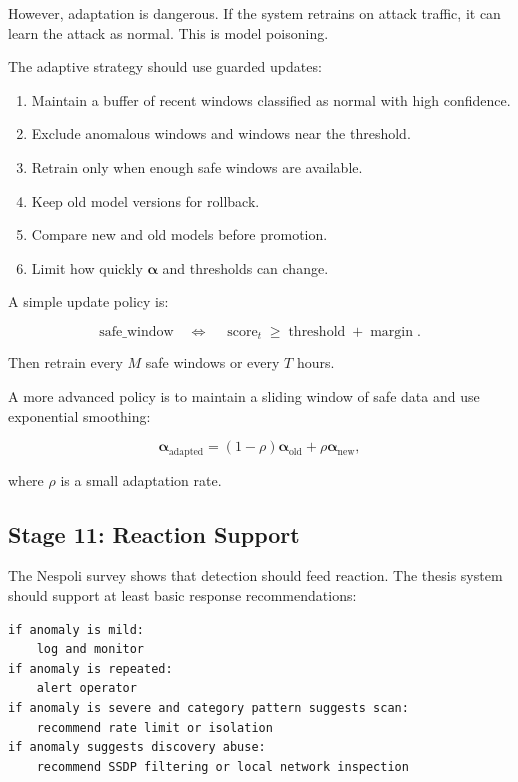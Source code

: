 \documentclass[11pt,a4paper]{article}
\begin{document}
However, adaptation is dangerous. If the system retrains on attack traffic, it can learn the attack as normal. This is model poisoning.

The adaptive strategy should use guarded updates:

\begin{enumerate}
  \item Maintain a buffer of recent windows classified as normal with high confidence.
  \item Exclude anomalous windows and windows near the threshold.
  \item Retrain only when enough safe windows are available.
  \item Keep old model versions for rollback.
  \item Compare new and old models before promotion.
  \item Limit how quickly \(\boldsymbol{\alpha}\) and thresholds can change.
\end{enumerate}

A simple update policy is:

\[
\mathrm{safe\_window}
\quad\Longleftrightarrow\quad
\operatorname{score}_t
\geq
\operatorname{threshold}+\operatorname{margin}.
\]

Then retrain every \(M\) safe windows or every \(T\) hours.

A more advanced policy is to maintain a sliding window of safe data and use exponential smoothing:

\[
\boldsymbol{\alpha}_{\mathrm{adapted}}
=
(1-\rho)\boldsymbol{\alpha}_{\mathrm{old}}
+\rho\boldsymbol{\alpha}_{\mathrm{new}},
\]

where \(\rho\) is a small adaptation rate.

\subsection{Stage 11: Reaction Support}

The Nespoli survey shows that detection should feed reaction. The thesis system should support at least basic response recommendations:

\begin{lstlisting}
if anomaly is mild:
    log and monitor
if anomaly is repeated:
    alert operator
if anomaly is severe and category pattern suggests scan:
    recommend rate limit or isolation
if anomaly suggests discovery abuse:
    recommend SSDP filtering or local network inspection
\end{lstlisting}
\end{document}
